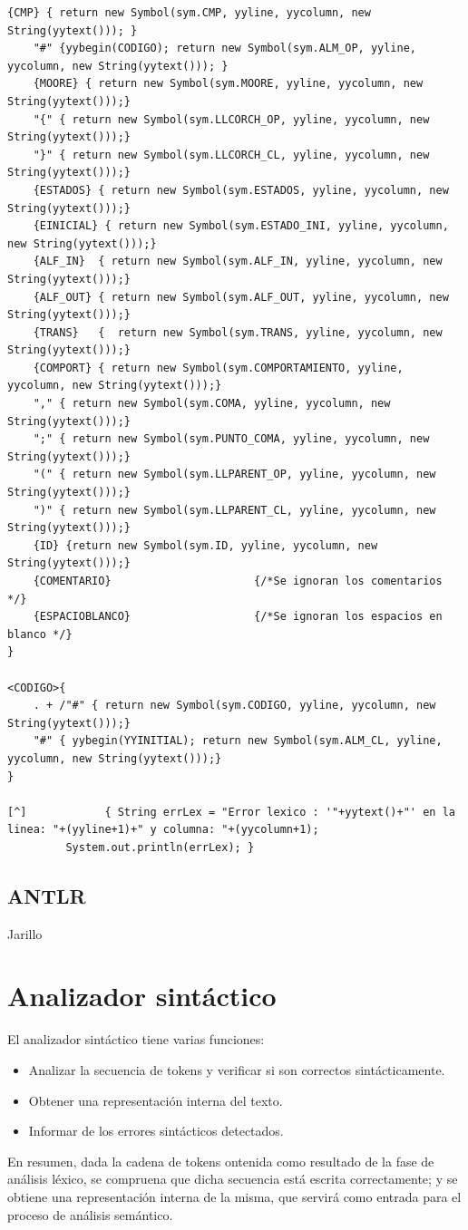\documentclass[12pt,a4paper]{article}
\begin{document}
\begin{lstlisting}[caption=Analizador Léxico en JFlex]
	{CMP} { return new Symbol(sym.CMP, yyline, yycolumn, new String(yytext())); }
	"#" {yybegin(CODIGO); return new Symbol(sym.ALM_OP, yyline, yycolumn, new String(yytext())); }
	{MOORE} { return new Symbol(sym.MOORE, yyline, yycolumn, new String(yytext()));}
	"{" { return new Symbol(sym.LLCORCH_OP, yyline, yycolumn, new String(yytext()));}
	"}" { return new Symbol(sym.LLCORCH_CL, yyline, yycolumn, new String(yytext()));}
	{ESTADOS} { return new Symbol(sym.ESTADOS, yyline, yycolumn, new String(yytext()));}
	{EINICIAL} { return new Symbol(sym.ESTADO_INI, yyline, yycolumn, new String(yytext()));}
	{ALF_IN}  { return new Symbol(sym.ALF_IN, yyline, yycolumn, new String(yytext()));}
	{ALF_OUT} { return new Symbol(sym.ALF_OUT, yyline, yycolumn, new String(yytext()));}
	{TRANS}   {  return new Symbol(sym.TRANS, yyline, yycolumn, new String(yytext()));}
	{COMPORT} { return new Symbol(sym.COMPORTAMIENTO, yyline, yycolumn, new String(yytext()));}
	"," { return new Symbol(sym.COMA, yyline, yycolumn, new String(yytext()));}
	";" { return new Symbol(sym.PUNTO_COMA, yyline, yycolumn, new String(yytext()));}
	"(" { return new Symbol(sym.LLPARENT_OP, yyline, yycolumn, new String(yytext()));}
	")" { return new Symbol(sym.LLPARENT_CL, yyline, yycolumn, new String(yytext()));}
	{ID} {return new Symbol(sym.ID, yyline, yycolumn, new String(yytext()));}
	{COMENTARIO}                      {/*Se ignoran los comentarios */}
	{ESPACIOBLANCO}                   {/*Se ignoran los espacios en blanco */}	
}

<CODIGO>{
	. + /"#" { return new Symbol(sym.CODIGO, yyline, yycolumn, new String(yytext()));}
	"#" { yybegin(YYINITIAL); return new Symbol(sym.ALM_CL, yyline, yycolumn, new String(yytext()));}
}

[^]            { String errLex = "Error lexico : '"+yytext()+"' en la linea: "+(yyline+1)+" y columna: "+(yycolumn+1);
		 System.out.println(errLex); }

\end{lstlisting}

\subsection{ANTLR}

Jarillo

\section{Analizador sintáctico}
El analizador sintáctico tiene varias funciones:
\begin{itemize}
	\item Analizar la secuencia de tokens y verificar si son correctos sintácticamente.
	\item Obtener una representación interna del texto.
	\item Informar de los errores sintácticos detectados.
\end{itemize}
En resumen, dada la cadena de tokens ontenida como resultado de la fase de análisis léxico, se compruena que dicha secuencia está escrita correctamente; y se obtiene una representación interna de la misma, que servirá como entrada para el proceso de análisis semántico. 
\end{document}
